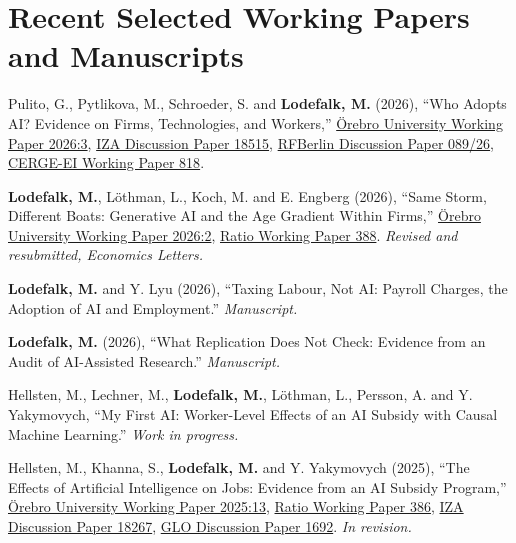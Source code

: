 \documentclass[11pt,a4paper]{article}
\newcommand{\name}[1]{\textbf{#1}}
\newcommand{\publication}[1]{\item #1}
\begin{document}
\section{Recent Selected Working Papers and Manuscripts}

\begin{enumerate}[label={[\arabic*]}]

\publication{Pulito, G., Pytlikova, M., Schroeder, S. and \name{Lodefalk, M.} (2026), ``Who Adopts AI? Evidence on Firms, Technologies, and Workers,'' \href{https://www.oru.se/globalassets/oru-sv/institutioner/hh/workingpapers/workingpapers2026/wp-3-2026.pdf}{Örebro University Working Paper 2026:3}, \href{https://www.iza.org/publications/dp/18515}{IZA Discussion Paper 18515}, \href{https://www.rfberlin.com/wp-content/uploads/2026/03/26089.pdf}{RFBerlin Discussion Paper 089/26}, \href{https://www.cerge-ei.cz/pdf/wp/Wp818.pdf}{CERGE-EI Working Paper 818}.}

\publication{\name{Lodefalk, M.}, Löthman, L., Koch, M. and E. Engberg (2026), ``Same Storm, Different Boats: Generative AI and the Age Gradient Within Firms,'' \href{https://www.oru.se/globalassets/oru-sv/institutioner/hh/workingpapers/workingpapers2026/wp-2-2026.pdf}{Örebro University Working Paper 2026:2}, \href{https://cms.ratio.se/app/uploads/2026/03/lodefalk_march16_paper_v2-kombinerades.pdf}{Ratio Working Paper 388}. \textit{Revised and resubmitted, Economics Letters.}} %

\publication{\name{Lodefalk, M.} and Y. Lyu (2026), ``Taxing Labour, Not AI: Payroll Charges, the Adoption of AI and Employment.'' \textit{Manuscript.}} %

\publication{\name{Lodefalk, M.} (2026), ``What Replication Does Not Check: Evidence from an Audit of AI-Assisted Research.'' \textit{Manuscript.}} %

\publication{Hellsten, M., Lechner, M., \name{Lodefalk, M.}, Löthman, L., Persson, A. and Y. Yakymovych, ``My First AI: Worker-Level Effects of an AI Subsidy with Causal Machine Learning.'' \textit{Work in progress.}} %

\publication{Hellsten, M., Khanna, S., \name{Lodefalk, M.} and Y. Yakymovych (2025), ``The Effects of Artificial Intelligence on Jobs: Evidence from an AI Subsidy Program,'' \href{https://www.oru.se/globalassets/oru-sv/institutioner/hh/workingpapers/workingpapers2025/wp-13-2025.pdf}{Örebro University Working Paper 2025:13}, \href{https://cms.ratio.se/app/uploads/2025/11/working-paper-386-1.pdf}{Ratio Working Paper 386}, \href{https://www.iza.org/publications/dp/18267}{IZA Discussion Paper 18267}, \href{https://ideas.repec.org/p/zbw/glodps/1692.html}{GLO Discussion Paper 1692}. \textit{In revision.}} %


\end{enumerate}
\end{document}
